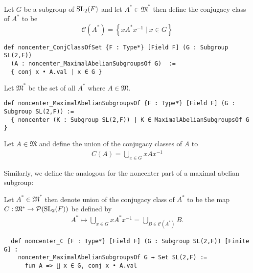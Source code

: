 \begin{definition}
  \label{noncenter_ConjClassOfSet}
  \leanok
  Let $G$ be a subgroup of $\operatorname{SL}_2(F)$ and let $A^* \in \mathfrak{M}^*$ then define the conjugacy class of $A^*$ to be
  \[
  \mathcal{C}(A^*) = \left\{x A^* x^{-1} \; | \; x \in G \right\}
   \]
\end{definition}
\begin{footnotesize}
\begin{verbatim}
def noncenter_ConjClassOfSet {F : Type*} [Field F] (G : Subgroup SL(2,F))
  (A : noncenter_MaximalAbelianSubgroupsOf G)  :=
  { conj x • A.val | x ∈ G }
\end{verbatim}
\end{footnotesize}

\begin{definition}
\label{noncenter_MaximalAbelianSubgroupsOf}
\leanok
Let $\mathfrak{M}^*$ be the set of all $A^*$ where $A \in \mathfrak{M}$.
\end{definition}
\begin{footnotesize}
\begin{verbatim}
def noncenter_MaximalAbelianSubgroupsOf {F : Type*} [Field F] (G : Subgroup SL(2,F)) :=
  { noncenter (K : Subgroup SL(2,F)) | K ∈ MaximalAbelianSubgroupsOf G }
\end{verbatim}
\end{footnotesize}

\begin{definition}
\label{C}
\leanok
Let $A \in \mathfrak{M}$ and define the union of the conjugacy classes of $A$ to
\begin{align*} 
  C(A) = \bigcup_{x \in G} x A x^{-1}
\end{align*}
\end{definition}


Similarly, we define the analogous for the noncenter part of a maximal abelian subgroup:

\begin{definition}
  \label{noncenter_C}
  \leanok
  Let $A^* \in \mathfrak{M}^*$ then denote union of the conjugacy class of $A^*$ to be the
  map $C : \mathfrak{M}^* \rightarrow \mathcal{P}(\operatorname{SL}_2(F))$ be defined by
\begin{align*}
  A^* \mapsto \bigcup_{x \in G} x A^* x^{-1} = \bigcup_{B \in \mathcal{C}(A^*)} B.
\end{align*}
\end{definition}
\begin{footnotesize}
  \begin{verbatim}
  def noncenter_C {F : Type*} [Field F] (G : Subgroup SL(2,F)) [Finite G] :
    noncenter_MaximalAbelianSubgroupsOf G → Set SL(2,F) :=
      fun A => ⋃ x ∈ G, conj x • A.val
  \end{verbatim}
\end{footnotesize}

